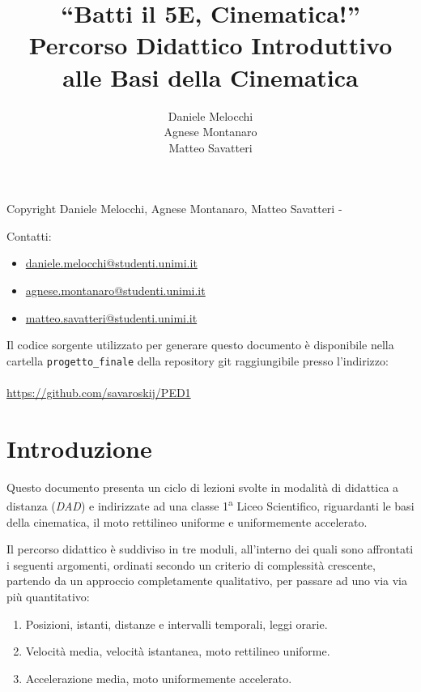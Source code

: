 \documentclass{report} \usepackage[T1]{fontenc} \usepackage[italian]{babel}
\title{
``Batti il 5E, Cinematica!''\\
\large Percorso Didattico Introduttivo alle Basi della Cinematica
}
\author{Daniele Melocchi\\Agnese Montanaro\\Matteo
Savatteri}
\begin{document}
\maketitle
\setcounter{page}{2}

Copyright Daniele Melocchi, Agnese Montanaro, Matteo Savatteri -
\the\year
\doclicenseThis

\vfill

Contatti:
\begin{itemize}
\item \textcolor{blue}{\href{mailto:daniele.melocchi@studenti.unimi.it}{daniele.melocchi@studenti.unimi.it}}
\item \textcolor{blue}{\href{mailto:agnese.montanaro@studenti.unimi.it}{agnese.montanaro@studenti.unimi.it}}
\item \textcolor{blue}{\href{mailto:matteo.savatteri@studenti.unimi.it}{matteo.savatteri@studenti.unimi.it}}
\end{itemize}

Il codice sorgente utilizzato per generare questo documento
è disponibile nella cartella \texttt{progetto\_finale} della
repository git raggiungibile presso l'indirizzo:
\\\\
\textcolor{blue}{\url{https://github.com/savaroskij/PED1}} \hfill {}

\thispagestyle{empty}

\tableofcontents

\chapter{Introduzione}
Questo documento presenta un ciclo di lezioni svolte in modalità
di didattica a distanza (\emph{DAD}) e
indirizzate ad una classe 1\textsuperscript{a} Liceo Scientifico,
riguardanti le basi della cinematica, il moto rettilineo uniforme
e uniformemente accelerato.

Il percorso didattico è suddiviso in tre moduli, all'interno dei quali
sono affrontati i seguenti argomenti, ordinati secondo un criterio
di complessità crescente, partendo da un approccio completamente
qualitativo, per passare ad uno via via più quantitativo:
\begin{enumerate}
\item Posizioni, istanti, distanze e intervalli temporali, leggi orarie.
\item Velocità media, velocità istantanea, moto rettilineo uniforme.
\item Accelerazione media, moto uniformemente
      accelerato.
\end{enumerate}
\end{document}
